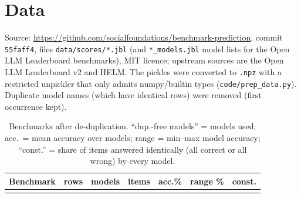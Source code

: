 \section{Data}
\label{app:data}
Source: \url{https://github.com/socialfoundations/benchmark-prediction}, commit \texttt{55faff4}, files \texttt{data/scores/*.jbl} (and \texttt{*\_models.jbl} model lists for the Open LLM Leaderboard benchmarks), MIT licence; upstream sources are the Open LLM Leaderboard v2 and HELM. The pickles were converted to \texttt{.npz} with a restricted unpickler that only admits numpy/builtin types (\texttt{code/prep\_data.py}). Duplicate model names (which have identical rows) were removed (first occurrence kept).
\begin{table}[h]
\caption{Benchmarks after de-duplication. ``dup.-free models'' = models used; acc.\ = mean accuracy over models; range = min--max model accuracy; ``const.'' = share of items answered identically (all correct or all wrong) by every model.}
\label{tab:data}
\centering\footnotesize
\begin{tabular}{lrrrrrr}
\toprule
Benchmark & rows & models & items & acc.\% & range \% & const.\\
\midrule
\\
\bottomrule
\end{tabular}
\end{table}

